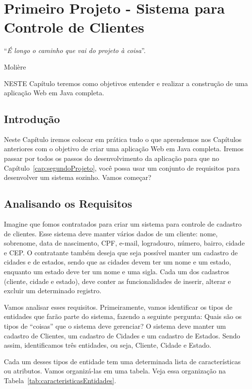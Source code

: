 \chapter{Primeiro Projeto - Sistema para Controle de Clientes}\label{cap:primeiroProjeto}
\epigraph{``\textit{É longo o caminho que vai do projeto à coisa}''.}{Molière}

\lettrine[lines=4, lhang=0.1, lraise=0, loversize=0.2, findent=0.1em]{\textcolor{corAzulTema}{N}}{ESTE} Capítulo teremos como objetivos entender e realizar a construção de uma aplicação Web em Java completa.


\section{Introdução}

Neste Capítulo iremos colocar em prática tudo o que aprendemos nos Capítulos anteriores com o objetivo de criar uma aplicação Web em Java completa. Iremos passar por todos os passos do desenvolvimento da aplicação para que no Capítulo~\ref{cap:segundoProjeto}, você possa usar um conjunto de requisitos para desenvolver um sistema sozinho. Vamos começar?


\section{Analisando os Requisitos}

Imagine que fomos contratados para criar um sistema para controle de cadastro de clientes. Esse sistema deve manter vários dados de um cliente: nome, sobrenome, data de nascimento, CPF, e-mail, logradouro, número, bairro, cidade e CEP. O contratante também deseja que seja possível manter um cadastro de cidades e de estados, sendo que as cidades devem ter um nome e um estado, enquanto um estado deve ter um nome e uma sigla. Cada um dos cadastros (cliente, cidade e estado), deve conter as funcionalidades de inserir, alterar e excluir um determinado registro.

Vamos analisar esses requisitos. Primeiramente, vamos identificar os tipos de entidades que farão parte do sistema, fazendo a seguinte pergunta: Quais são os tipos de ``coisas'' que o sistema deve gerenciar? O sistema deve manter um cadastro de Clientes, um cadastro de Cidades e um cadastro de Estados. Sendo assim, identificamos três entidades, ou seja, Cliente, Cidade e Estado.

Cada um desses tipos de entidade tem uma determinada lista de características ou atributos. Vamos organizá-las em uma tabela. Veja essa organização na Tabela~\ref{tab:caracteristicasEntidades}.

